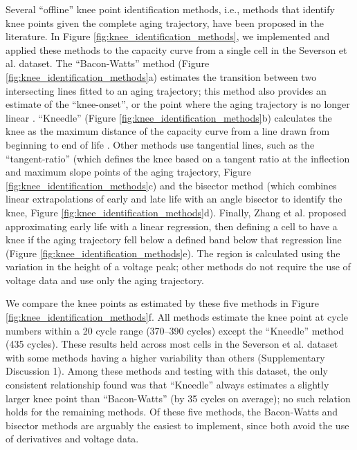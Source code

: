 \documentclass[journal=jpclcd,manuscript=article]{achemso}
\begin{document}
Several ``offline'' knee point identification methods, i.e., methods that identify knee points given the complete aging trajectory, have been proposed in the literature.
In Figure \ref{fig:knee_identification_methods}, we implemented and applied these methods to the capacity curve from a single cell in the Severson et al.\cite{severson_data-driven_2019} dataset.
The ``Bacon-Watts'' method (Figure \ref{fig:knee_identification_methods}a) estimates the transition between two intersecting lines fitted to an aging trajectory; this method also provides an estimate of the ``knee-onset'', or the point where the aging trajectory is no longer linear \cite{fermin-cueto_identification_2020}.
``Kneedle'' (Figure \ref{fig:knee_identification_methods}b) calculates the knee as the maximum distance of the capacity curve from a line drawn from beginning to end of life \cite{satopaa_finding_2011}.
Other methods use tangential lines, such as the ``tangent-ratio'' (which defines the knee based on a tangent ratio at the inflection and maximum slope points of the aging trajectory, Figure \ref{fig:knee_identification_methods}c)\cite{diao_algorithm_2019} and the bisector method (which combines linear extrapolations of early and late life with an angle bisector to identify the knee, Figure \ref{fig:knee_identification_methods}d)\cite{greenbank_automated_nodate}. Finally, Zhang et al.\cite{zhang_accelerated_2019} proposed approximating early life with a linear regression, then defining a cell to have a knee if the aging trajectory fell below a defined band below that regression line (Figure \ref{fig:knee_identification_methods}e). The region is calculated using the variation in the height of a voltage peak; other methods do not require the use of voltage data and use only the aging trajectory.

We compare the knee points as estimated by these five methods in Figure \ref{fig:knee_identification_methods}f.
All methods estimate the knee point at cycle numbers within a 20 cycle range (370--390 cycles) except the ``Kneedle'' method (435 cycles). 
These results held across most cells in the Severson et al.\cite{severson_data-driven_2019} dataset with some methods having a higher variability than others (Supplementary Discussion 1). 
Among these methods and testing with this dataset, the only consistent relationship found was that  ``Kneedle'' always estimates a slightly larger knee point than ``Bacon-Watts'' (by 35 cycles on average); no such relation holds for the remaining methods. 
Of these five methods, the Bacon-Watts and bisector methods are arguably the easiest to implement, since both avoid the use of derivatives and voltage data.
\end{document}
